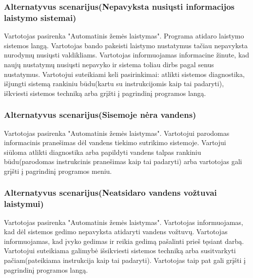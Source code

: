 \documentclass[oneside]{VUMIFPSkursinis}
\begin{document}
	\subsubsection{Alternatyvus scenarijus(Nepavyksta nusiųsti informacijos laistymo sistemai)}
	Vartotojas pasirenka "Automatinis žemės laistymas". Programa atidaro laistymo sistemos langą. Vartotojas bando pakeisti laistymo nustatymus tačiau nepavyksta nurodymų nusiųsti valdikliams. Vartotojas informuojamas informacine žinute, kad naujų nustatymų nusiųsti nepavyko ir sistema toliau dirbs pagal senus nustatymus. Vartotojui suteikiami keli pasirinkimai: atlikti sistemos diagnostika, išjungti sistemą rankiniu būdu(kartu su instrukcijomis kaip tai padaryti), iškviesti sistemos techniką arba grįžti į pagrindinį programos langą.
	\subsubsection{Alternatyvus scenarijus(Sisemoje nėra vandens)}
	Vartotojas pasirenka "Automatinis žemės laistymas". Vartotojui parodomas informacinis pranešimas dėl vandens tiekimo sutrikimo sistemoje. Vartojui siūloma atlikti diagnostika arba papildyti vandens talpas rankiniu būdu(parodomas instrukcinis pranešimas kaip tai padaryti) arba vartotojas gali grįšti į pagrindinį programos meniu.
	\subsubsection{Alternatyvus scenarijus(Neatsidaro vandens vožtuvai laistymui)}
	Vartotojas pasirenka "Automatinis žemės laistymas". Vartotojas informuojamas, kad dėl sistemos gedimo nepavyksta atidaryti vandens vožtuvų. Vartotojas informuojamas, kad įvyko gedimas ir reikia gedimą pašalinti prieš tęsiant darbą. Vartotojui suteikiama galimybė išsikviesti sistemos techniką arba susitvarkyti pačiam(pateikiama instrukcija kaip tai padaryti).  Vartotojas taip pat gali grįšti į pagrindinį programos langą.
\end{document}
